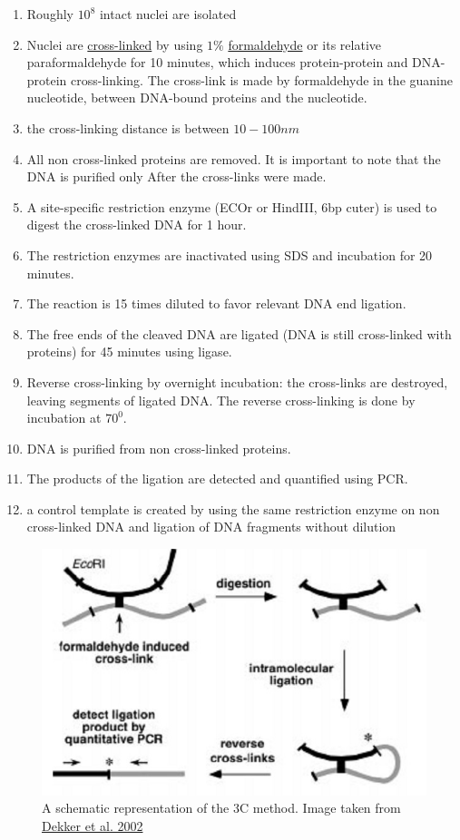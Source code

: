 \documentclass[12pt]{paper}
\begin{document}
\begin{enumerate}
\item Roughly $10^8$ intact nuclei are isolated
\item Nuclei are \href{http://en.wikipedia.org/wiki/Crosslinking_of_DNA}{cross-linked} by using $1\%$
\href{http://en.wikipedia.org/wiki/Formaldehyde}{formaldehyde} or its relative paraformaldehyde for 10 minutes, which induces protein-protein and DNA-protein cross-linking. The cross-link is made by formaldehyde in the guanine nucleotide, between DNA-bound proteins and the nucleotide. 
\item the cross-linking distance is between $10-100nm$ \cite{dekker2013exploring}
\item All non cross-linked proteins are removed.  It is important to note that the DNA is purified only After the cross-links were made.
\item A site-specific restriction enzyme (ECOr or HindIII, 6bp cuter) is used to digest the cross-linked DNA for 1 hour. 
\item The restriction enzymes are inactivated using SDS and incubation for 20 minutes.
\item The reaction is 15 times diluted to favor relevant DNA end ligation.
\item The free ends of the cleaved DNA are ligated (DNA is still cross-linked with proteins) for 45 minutes using ligase.
\item Reverse cross-linking by overnight incubation: the cross-links are destroyed, leaving segments of ligated DNA. The reverse cross-linking is done by incubation at $70^0$.
\item DNA is purified from non cross-linked proteins.
\item The products of the ligation are detected and quantified using PCR. 
\item a control template is created by using the same restriction enzyme on non cross-linked DNA and ligation of DNA fragments without dilution
\end{enumerate}

\begin{figure}[H]
\includegraphics[scale = 0.4]{3Cschematic}
\caption{\scriptsize{A schematic representation of the 3C method. Image taken from \href{http://www.sciencemag.org/content/295/5558/1306.full.pdf}{Dekker et al. 2002}\cite{dekker2002capturing}}}
\label{3Cschematic}
\end{figure}
\end{document}
